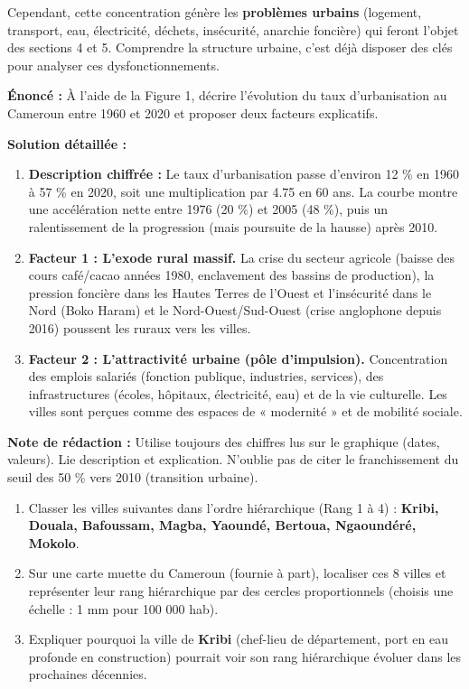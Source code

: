 \documentclass[11pt]{article}
\begin{document}
Cependant, cette concentration génère les \textbf{problèmes urbains} (logement, transport, eau, électricité, déchets, insécurité, anarchie foncière) qui feront l'objet des sections 4 et 5. Comprendre la structure urbaine, c'est déjà disposer des clés pour analyser ces dysfonctionnements.

\begin{exoresolu}
\textbf{Énoncé :} À l'aide de la Figure 1, décrire l'évolution du taux d'urbanisation au Cameroun entre 1960 et 2020 et proposer deux facteurs explicatifs.

\tcblower
\textbf{Solution détaillée :}
\begin{enumerate}
    \item \textbf{Description chiffrée :} Le taux d'urbanisation passe d'environ \num{12} \% en 1960 à \num{57} \% en 2020, soit une multiplication par \num{4,75} en 60 ans. La courbe montre une accélération nette entre 1976 (\num{20} \%) et 2005 (\num{48} \%), puis un ralentissement de la progression (mais poursuite de la hausse) après 2010.
    \item \textbf{Facteur 1 : L'exode rural massif.} La crise du secteur agricole (baisse des cours café/cacao années 1980, enclavement des bassins de production), la pression foncière dans les Hautes Terres de l'Ouest et l'insécurité dans le Nord (Boko Haram) et le Nord-Ouest/Sud-Ouest (crise anglophone depuis 2016) poussent les ruraux vers les villes.
    \item \textbf{Facteur 2 : L'attractivité urbaine (pôle d'impulsion).} Concentration des emplois salariés (fonction publique, industries, services), des infrastructures (écoles, hôpitaux, électricité, eau) et de la vie culturelle. Les villes sont perçues comme des espaces de « modernité » et de mobilité sociale.
\end{enumerate}
\textbf{Note de rédaction :} Utilise toujours des chiffres lus sur le graphique (dates, valeurs). Lie description et explication. N'oublie pas de citer le franchissement du seuil des 50 \% vers 2010 (transition urbaine).
\end{exoresolu}

\begin{exercice}
\begin{enumerate}
    \item Classer les villes suivantes dans l'ordre hiérarchique (Rang 1 à 4) : \textbf{Kribi, Douala, Bafoussam, Magba, Yaoundé, Bertoua, Ngaoundéré, Mokolo}.
    \item Sur une carte muette du Cameroun (fournie à part), localiser ces 8 villes et représenter leur rang hiérarchique par des cercles proportionnels (choisis une échelle : 1 mm pour 100 000 hab).
    \item Expliquer pourquoi la ville de \textbf{Kribi} (chef-lieu de département, port en eau profonde en construction) pourrait voir son rang hiérarchique évoluer dans les prochaines décennies.
\end{enumerate}
\end{exercice}
\end{document}
